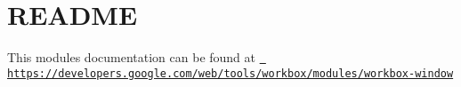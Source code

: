 \chapter{README}
\hypertarget{md_pkiclassroomrescheduler_2src_2main_2frontend_2node__modules_2workbox-window_2_r_e_a_d_m_e}{}\label{md_pkiclassroomrescheduler_2src_2main_2frontend_2node__modules_2workbox-window_2_r_e_a_d_m_e}
This module\textquotesingle{}s documentation can be found at \href{https://developers.google.com/web/tools/workbox/modules/workbox-window}{\texttt{ https\+://developers.\+google.\+com/web/tools/workbox/modules/workbox-\/window}} 